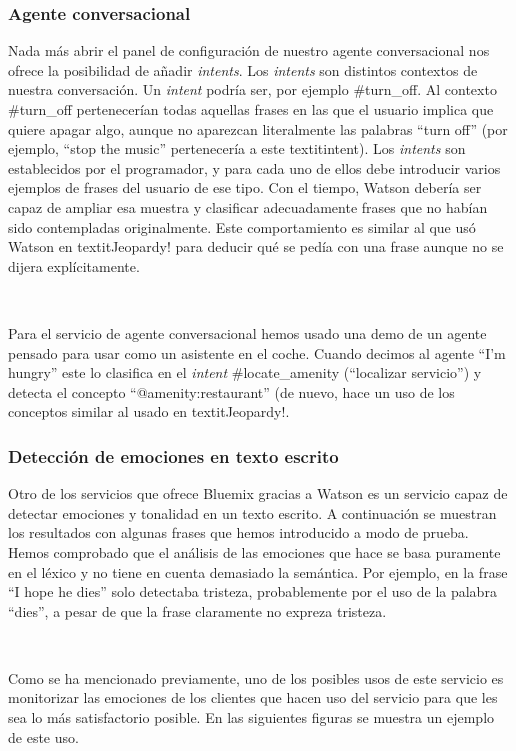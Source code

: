 \documentclass[paper=a4, fontsize=10pt]{scrartcl} %
\numberwithin{equation}{section} %
\numberwithin{figure}{section} %
\numberwithin{table}{section} %
\begin{document}
\subsubsection{Agente conversacional}

Nada más abrir el panel de configuración de nuestro agente conversacional nos ofrece la posibilidad de añadir \textit{intents}. Los \textit{intents} son distintos contextos de nuestra conversación. Un \textit{intent} podría ser, por ejemplo \#turn\_off. Al contexto \#turn\_off pertenecerían todas aquellas frases en las que el usuario implica que quiere apagar algo, aunque no aparezcan literalmente las palabras ``turn off'' (por ejemplo, ``stop the music'' pertenecería a este textit{intent}). Los \textit{intents} son establecidos por el programador, y para cada uno de ellos debe introducir varios ejemplos de frases del usuario de ese tipo. Con el tiempo, Watson debería ser capaz de ampliar esa muestra y clasificar adecuadamente frases que no habían sido contempladas originalmente. Este comportamiento es similar al que usó Watson en textit{Jeopardy!} para deducir qué se pedía con una frase aunque no se dijera explícitamente.

\

Para el servicio de agente conversacional hemos usado una demo de un agente pensado para usar como un asistente en el coche. Cuando decimos al agente ``I'm hungry'' este lo clasifica en el \textit{intent} \#locate\_amenity (``localizar servicio'') y detecta el concepto ``@amenity:restaurant'' (de nuevo, hace un uso de los conceptos similar al usado en textit{Jeopardy!}.

\subsubsection{Detección de emociones en texto escrito}

Otro de los servicios que ofrece Bluemix gracias a Watson es un servicio capaz de detectar emociones y tonalidad en un texto escrito. A continuación se muestran los resultados con algunas frases que hemos introducido a modo de prueba. Hemos comprobado que el análisis de las emociones que hace se basa puramente en el léxico y no tiene en cuenta demasiado la semántica. Por ejemplo, en la frase ``I hope he dies'' solo detectaba tristeza, probablemente por el uso de la palabra ``dies'', a pesar de que la frase claramente no expreza tristeza.

\

Como se ha mencionado previamente, uno de los posibles usos de este servicio es monitorizar las emociones de los clientes que hacen uso del servicio para que les sea lo más satisfactorio posible. En las siguientes figuras se muestra un ejemplo de este uso.
\end{document}
